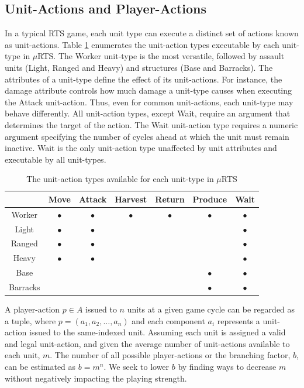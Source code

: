\documentclass[conference]{IEEEtran}
\newcommand{\mRTS}{$\mu$RTS}
\begin{document}
\subsection{Unit-Actions and Player-Actions}

In a typical RTS game, each unit type can execute a distinct set of actions known as unit-actions. Table \ref{unitActionsTable} enumerates the unit-action types executable by each unit-type in \mRTS{}. The Worker unit-type is the most versatile, followed by assault units (Light, Ranged and Heavy) and structures (Base and Barracks). The attributes of a unit-type define the effect of its unit-actions. For instance, the damage attribute controls how much damage a unit-type causes when executing the Attack unit-action. Thus, even for common unit-actions, each unit-type may behave differently. All unit-action types, except Wait, require an argument that determines the target of the action. The Wait unit-action type requires a numeric argument specifying the number of cycles ahead at which the unit must remain inactive. Wait is the only unit-action type unaffected by unit attributes and executable by all unit-types.

\begin{table}[!t]
\renewcommand{\arraystretch}{1.3}
\caption{The unit-action types available for each unit-type in \mRTS{}}
\label{unitActionsTable}
\centering
\begin{tabular}{c|c|c|c|c|c|c}
\cline{2-7}
\multicolumn{1}{c|}{} & Move & Attack & Harvest & Return & Produce & Wait \\
\hline \hline
Worker   & $\bullet$ & $\bullet$ & $\bullet$ & $\bullet$ & $\bullet$ & $\bullet$ \\
Light    & $\bullet$ & $\bullet$ & & & & $\bullet$ \\
Ranged   & $\bullet$ & $\bullet$ & & & & $\bullet$ \\
Heavy    & $\bullet$ & $\bullet$ & & & & $\bullet$ \\
Base     & & & & & $\bullet$ & $\bullet$ \\
Barracks & & & & & $\bullet$ & $\bullet$ \\
\hline
\end{tabular}
\end{table}

A player-action $p \in A$ issued to $n$ units at a given game cycle can be regarded as a tuple, where $p = (a_1, a_2, \dots, a_n)$ and each component $a_i$ represents a unit-action issued to the same-indexed unit. Assuming each unit is assigned a valid and legal unit-action, and given the average number of unit-actions available to each unit, $m$. The number of all possible player-actions or the branching factor, $b$, can be estimated as $b = m^n$. We seek to lower $b$ by finding ways to decrease $m$ without negatively impacting the playing strength.
\end{document}
